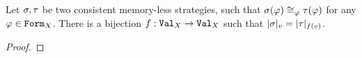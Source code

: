 \begin{theorem}
Let $\sigma, \tau$ be two consistent memory-less strategies, such that
$\sigma(\varphi) \cong_{\varphi} \tau(\varphi)$ for any $\varphi\in\mathtt{Form}_X$.
There is a bijection $f:\mathtt{Val}_X -> \mathtt{Val}_X$ such that
$|\sigma|_{v} = |\tau|_{f(v)}$.
\end{theorem}

\begin{proof}









\end{proof}
